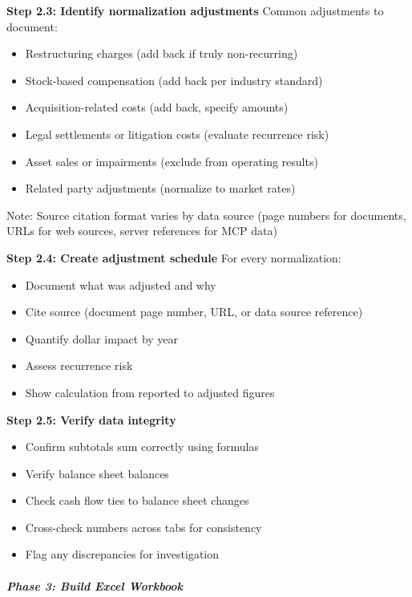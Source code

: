 \documentclass[11pt]{article}
\begin{document}
\textbf{Step 2.3: Identify normalization adjustments} Common adjustments to document:

\begin{itemize}[leftmargin=*,itemsep=2pt,topsep=2pt]
\item {} Restructuring charges (add back if truly non-recurring)
\item {} Stock-based compensation (add back per industry standard)
\item {} Acquisition-related costs (add back, specify amounts)
\item {} Legal settlements or litigation costs (evaluate recurrence risk)
\item {} Asset sales or impairments (exclude from operating results)
\item {} Related party adjustments (normalize to market rates)
\end{itemize}
Note: Source citation format varies by data source (page numbers for documents, URLs for web sources, server references for MCP data)


\textbf{Step 2.4: Create adjustment schedule} For every normalization:

\begin{itemize}[leftmargin=*,itemsep=2pt,topsep=2pt]
\item {} Document what was adjusted and why
\item {} Cite source (document page number, URL, or data source reference)
\item {} Quantify dollar impact by year
\item {} Assess recurrence risk
\item {} Show calculation from reported to adjusted figures
\end{itemize}

\textbf{Step 2.5: Verify data integrity}

\begin{itemize}[leftmargin=*,itemsep=2pt,topsep=2pt]
\item {} Confirm subtotals sum correctly using formulas
\item {} Verify balance sheet balances
\item {} Check cash flow ties to balance sheet changes
\item {} Cross-check numbers across tabs for consistency
\item {} Flag any discrepancies for investigation
\end{itemize}

\subparagraph{Phase 3: Build Excel Workbook}\mbox{}\par
\end{document}
